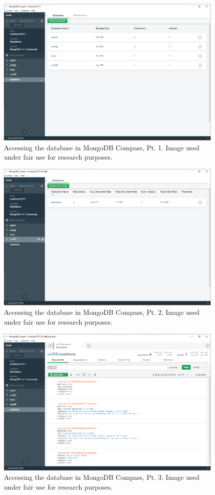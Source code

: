 \documentclass[titlepage, 12pt]{article}
\begin{document}
\begin{figure}[p]
    \centering\includegraphics[width=0.75\linewidth]{images/mongodb-compass-2.png}
    \caption{Accessing the database in MongoDB Compass, Pt. 1. Image used under fair use for research purposes.}
\end{figure}

\begin{figure}[p]
    \centering\includegraphics[width=0.75\linewidth]{images/mongodb-compass-3.png}
    \caption{Accessing the database in MongoDB Compass, Pt. 2. Image used under fair use for research purposes.}
\end{figure}

\begin{figure}[p]
    \centering\includegraphics[width=0.75\linewidth]{images/mongodb-compass-4.png}
    \caption{Accessing the database in MongoDB Compass, Pt. 3. Image used under fair use for research purposes.}
\end{figure}
\end{document}
